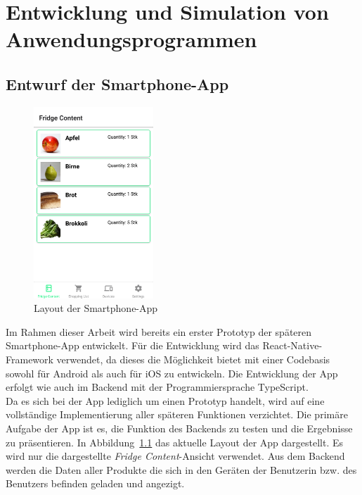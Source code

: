 \chapter{Entwicklung und Simulation von Anwendungsprogrammen}\label{ch:Entwicklung und Simulation des Frontends}
\section{Entwurf der Smartphone-App}\label{sec:Entwurf der Android-App}

\begin{figure}
    \centering
    \includegraphics[width=0.4\textwidth]{figures/4.1.png}
    \caption{Layout der Smartphone-App}
    \label{fig:4.1}
\end{figure}

Im Rahmen dieser Arbeit wird bereits ein erster Prototyp der späteren Smartphone-App entwickelt. Für die Entwicklung wird das React-Native-Framework verwendet, da dieses die Möglichkeit bietet mit einer Codebasis sowohl für Android als auch für iOS zu entwickeln. Die Entwicklung der App erfolgt wie auch im Backend mit der Programmiersprache TypeScript.\\ Da es sich bei der App lediglich um einen Prototyp handelt, wird auf eine vollständige Implementierung aller späteren Funktionen verzichtet. Die primäre Aufgabe der App ist es, die Funktion des Backends zu testen und die Ergebnisse zu präsentieren. In Abbildung~\ref{fig:4.1} das aktuelle Layout der App dargestellt. Es wird nur die dargestellte \textit{Fridge Content}-Ansicht verwendet. Aus dem Backend werden die Daten aller Produkte die sich in den Geräten der Benutzerin bzw. des Benutzers befinden geladen und angezigt.

